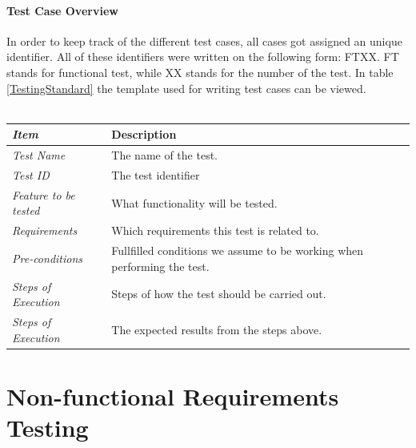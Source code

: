 \paragraph{Test Case Overview} In order to keep track of the different test cases, all cases got assigned an unique identifier. All of these identifiers were written on the following form: FTXX. FT stands for functional test, while XX stands for the number of the test. In table \ref{TestingStandard} the template used for writing test cases can be viewed. \\ \\ 
%
\begin{minipage}{\linewidth}
\setlength{\tabcolsep}{15pt}
\centering
{}
\begin{tabular}{ |l|p{70mm}| }
	\hline
	\it{\cellcolor{gray!25}Item} & {\cellcolor{gray!25} Description } \\
	\hline
	\it{\cellcolor{gray!25}Test Name } & The name of the test.  \\ \hline
	\it{\cellcolor{gray!25}Test ID} & The test identifier  \\ \hline
	\it{\cellcolor{gray!25}Feature to be tested} & What functionality will be tested.  \\ \hline
	\it{\cellcolor{gray!25}Requirements} & Which requirements this test is related to.  \\ \hline
	\it{\cellcolor{gray!25}Pre-conditions} & Fullfilled conditions we assume to be working when performing the test.  \\ \hline
	\it{\cellcolor{gray!25}Steps of Execution} & Steps of how the test should be carried out.  \\ \hline
	\it{\cellcolor{gray!25}Steps of Execution} & The expected results from the steps above.  \\
	\hline
\end{tabular}
\end{minipage}

\section{Non-functional Requirements Testing}
\label{sec:TestingNRT}

